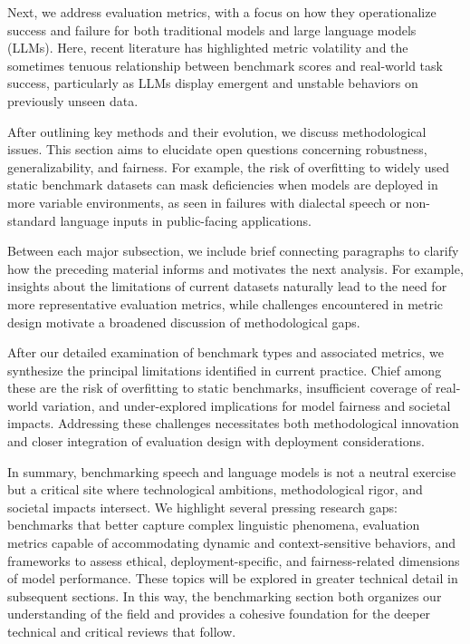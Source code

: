 \documentclass[sigconf]{acmart}
\begin{document}
Next, we address evaluation metrics, with a focus on how they operationalize success and failure for both traditional models and large language models (LLMs). Here, recent literature has highlighted metric volatility and the sometimes tenuous relationship between benchmark scores and real-world task success, particularly as LLMs display emergent and unstable behaviors on previously unseen data.

After outlining key methods and their evolution, we discuss methodological issues. This section aims to elucidate open questions concerning robustness, generalizability, and fairness. For example, the risk of overfitting to widely used static benchmark datasets can mask deficiencies when models are deployed in more variable environments, as seen in failures with dialectal speech or non-standard language inputs in public-facing applications.

Between each major subsection, we include brief connecting paragraphs to clarify how the preceding material informs and motivates the next analysis. For example, insights about the limitations of current datasets naturally lead to the need for more representative evaluation metrics, while challenges encountered in metric design motivate a broadened discussion of methodological gaps.

After our detailed examination of benchmark types and associated metrics, we synthesize the principal limitations identified in current practice. Chief among these are the risk of overfitting to static benchmarks, insufficient coverage of real-world variation, and under-explored implications for model fairness and societal impacts. Addressing these challenges necessitates both methodological innovation and closer integration of evaluation design with deployment considerations.

In summary, benchmarking speech and language models is not a neutral exercise but a critical site where technological ambitions, methodological rigor, and societal impacts intersect. We highlight several pressing research gaps: benchmarks that better capture complex linguistic phenomena, evaluation metrics capable of accommodating dynamic and context-sensitive behaviors, and frameworks to assess ethical, deployment-specific, and fairness-related dimensions of model performance. These topics will be explored in greater technical detail in subsequent sections. In this way, the benchmarking section both organizes our understanding of the field and provides a cohesive foundation for the deeper technical and critical reviews that follow.
\end{document}
